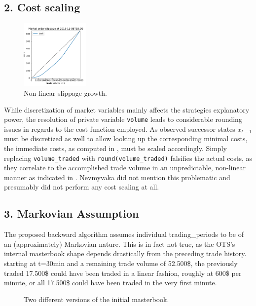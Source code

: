 \subsection*{2. Cost scaling}
\begin{figure}
	\centering
	\includegraphics[width=0.3\textwidth]{content/drawings/nonlinearcosts}
	\caption{Non-linear slippage growth.}
	\label{fig:nonlinearcosts}
\end{figure}
While discretization of market variables mainly affects the strategies explanatory power, the resolution of private variable \lstinline!volume! leads to considerable rounding issues in regards to the cost function employed. As observed successor states $x_{t-1}$ must be discretized as well to allow looking up the corresponding minimal costs, the immediate costs, as computed in , must be scaled accordingly. Simply replacing \lstinline!volume_traded! with \lstinline!round(volume_traded)! falsifies the actual costs, as they correlate to the accomplished trade volume in an  unpredictable, non-linear manner as indicated in . Nevmyvaka \etal \Cite{Nevmyvaka:2006} did not mention this problematic and presumably did not perform any cost scaling at all.



\subsection*{3. Markovian Assumption}
The proposed backward algorithm assumes individual trading\_periods to be of an (approximately) Markovian nature. This is in fact not true, as the \ac{OTS}'s internal masterbook shape depends drastically from the preceding trade history.\\
\Eg starting at t=30min and a remaining trade volume of 52.500\$, the previously traded 17.500\$ could have been traded in a linear fashion, roughly at 600\$ per minute, or all 17.500\$ could have been traded in the very first minute.\\

\begin{figure}[ht]
	\centering
	[placeholder]
	\caption{Two different versions of the initial masterbook.}
	\label{fig:differingmasterbooks}
\end{figure}

